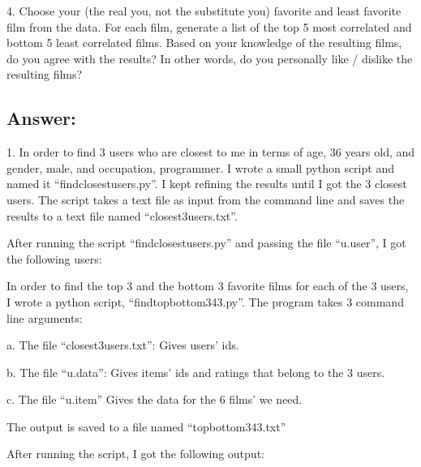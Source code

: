 \documentclass[a4paper, 11pt]{article}
\begin{document}
4.  Choose your (the real you, not the substitute you) favorite and
least favorite film from the data.  For each film, generate a list
of the top 5 most correlated and bottom 5 least correlated films.
Based on your knowledge of the resulting films, do you agree with
the results?  In other words, do you personally like / dislike
the resulting films?

\subsection*{Answer:}
1. In order to find 3 users who are closest to me in terms of age, 36 years old, and gender, male, and occupation, programmer. I wrote a small python script and named it ``findclosestusers.py''. I kept refining the results until I got the 3 closest users. The script takes a text file as input from the command line and saves the results to a text file named ``closest3users.txt''.



After running the script ``findclosestusers.py'' and passing the file ``u.user'', I got the following users:




In order to find the top 3 and the bottom 3 favorite films for each of the 3 users, I wrote a python script, ``findtopbottom343.py''. The program takes 3 command line arguments:

a. The file ``closest3users.txt'': Gives users' ids.

b. The file ``u.data'': Gives items' ids and ratings that belong to the 3 users.

c. The file ``u.item'' Gives the data for the 6 films' we need.

The output is saved to a file named ``topbottom343.txt''



After running the script, I got the following output:
\end{document}
